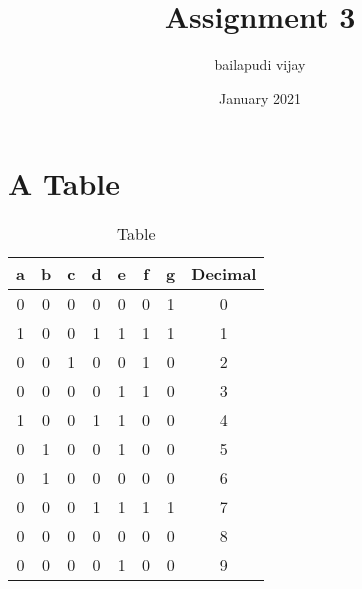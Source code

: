 \documentclass{article}
\title{ Assignment 3}
\author{bailapudi vijay }
\date{January 2021}
\begin{document}
\maketitle

\section{A Table}
\begin{table}[h]
\centering
\begin{tabular}{|c|c|c|c|c|c|c|c|}
\hline
\textbf{a} & \textbf{b} & \textbf{c} & \textbf{d} & \textbf{e} & \textbf{f} & \textbf{g} & \textbf{Decimal} \\ \hline

0&0&0&0&0&0&1&0\\\hline
1&0&0&1&1&1&1&1\\\hline
0&0&1&0&0&1&0&2\\\hline
0&0&0&0&1&1&0&3\\\hline
1&0&0&1&1&0&0&4\\\hline
0&1&0&0&1&0&0&5\\\hline
0&1&0&0&0&0&0&6\\\hline
0&0&0&1&1&1&1&7\\\hline
0&0&0&0&0&0&0&8\\\hline
0&0&0&0&1&0&0&9\\\hline



\hline
\end{tabular}
\caption{Table}
\label{tab:table1}
\end{table}
  
\end{document}
